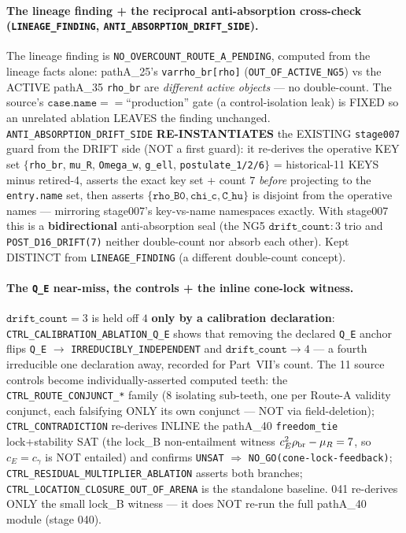 \paragraph{The lineage finding + the reciprocal anti-absorption cross-check (\texttt{LINEAGE\_FINDING}, \texttt{ANTI\_ABSORPTION\_DRIFT\_SIDE}).}
The lineage finding is \texttt{NO\_OVERCOUNT\_ROUTE\_A\_PENDING}, computed from
the lineage facts alone: pathA\_25's \texttt{varrho\_br[rho]}
(\texttt{OUT\_OF\_ACTIVE\_NG5}) vs the ACTIVE pathA\_35 \texttt{rho\_br} are
\emph{different active objects} --- no double-count. The source's
\(\texttt{case.name}==\)``production'' gate (a control-isolation leak) is FIXED
so an unrelated ablation LEAVES the finding unchanged.
\texttt{ANTI\_ABSORPTION\_DRIFT\_SIDE} \textbf{RE-INSTANTIATES} the EXISTING
\texttt{stage007} guard from the DRIFT side (NOT a first guard): it re-derives
the operative KEY set \(\{\)\texttt{rho\_br}, \texttt{mu\_R}, \texttt{Omega\_w},
\texttt{g\_ell}, \texttt{postulate\_1/2/6}\(\}\) = historical-11 KEYS minus
retired-4, asserts the exact key set + count \(7\) \emph{before} projecting to
the \texttt{entry.name} set, then asserts
\(\{\texttt{rho\_B0},\texttt{chi\_c},\texttt{C\_hu}\}\) is disjoint from the
operative names --- mirroring stage007's key-vs-name namespaces exactly. With
stage007 this is a \textbf{bidirectional} anti-absorption seal (the NG5
\(\texttt{drift\_count}:3\) trio and \texttt{POST\_D16\_DRIFT(7)} neither
double-count nor absorb each other). Kept DISTINCT from \texttt{LINEAGE\_FINDING}
(a different double-count concept).

\paragraph{The \texttt{Q\_E} near-miss, the controls + the inline cone-lock witness.}
\(\texttt{drift\_count}=3\) is held off \(4\) \textbf{only by a calibration
declaration}: \texttt{CTRL\_CALIBRATION\_ABLATION\_Q\_E} shows that removing the
declared \texttt{Q\_E} anchor flips \texttt{Q\_E} \(\to\)
\texttt{IRREDUCIBLY\_INDEPENDENT} and \(\texttt{drift\_count}\to4\) --- a fourth
irreducible one declaration away, recorded for Part~VII's count. The 11 source
controls become individually-asserted computed teeth: the
\texttt{CTRL\_ROUTE\_CONJUNCT\_*} family (8 isolating sub-teeth, one per Route-A
validity conjunct, each falsifying ONLY its own conjunct --- NOT via
field-deletion); \texttt{CTRL\_CONTRADICTION} re-derives INLINE the pathA\_40
\texttt{freedom\_tie} lock+stability SAT (the lock\_B non-entailment witness
\(c_E^2\rho_{\rm br}-\mu_R=7\), so \(c_E=c_\gamma\) is NOT entailed) and confirms
\texttt{UNSAT} \(\Rightarrow\) \texttt{NO\_GO(cone-lock-feedback)};
\texttt{CTRL\_RESIDUAL\_MULTIPLIER\_ABLATION} asserts both branches;
\texttt{CTRL\_LOCATION\_CLOSURE\_OUT\_OF\_ARENA} is the standalone baseline. 041
re-derives ONLY the small lock\_B witness --- it does NOT re-run the full
pathA\_40 module (stage 040).


